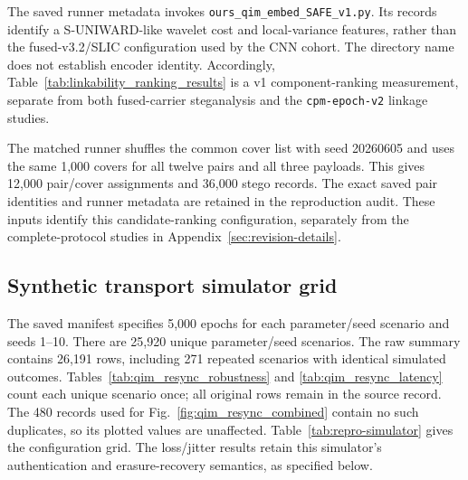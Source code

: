 \documentclass[journal]{IEEEtran}
\theoremstyle{definition}
\theoremstyle{game}
\begin{document}
The saved runner metadata invokes \texttt{ours\_qim\_embed\_SAFE\_v1.py}.
Its records identify a S-UNIWARD-like wavelet cost and local-variance
features, rather than the fused-v3.2/SLIC configuration used by the CNN
cohort. The directory name does not establish encoder identity. Accordingly,
Table~\ref{tab:linkability_ranking_results} is a v1 component-ranking
measurement, separate from both fused-carrier steganalysis and the
\texttt{cpm-epoch-v2} linkage studies.

The matched runner shuffles the common cover list with seed 20260605 and
uses the same 1,000 covers for all twelve pairs and all three payloads.
This gives 12,000 pair/cover assignments and 36,000 stego records.
The exact saved pair identities and runner metadata are retained in the
reproduction audit. These inputs identify this candidate-ranking configuration, separately
from the complete-protocol studies in Appendix~\ref{sec:revision-details}.

\subsection{Synthetic transport simulator grid}
\label{subsec:repro-simulator}
The saved manifest specifies 5,000 epochs for each parameter/seed
scenario and seeds 1--10. There are 25,920 unique parameter/seed scenarios.
The raw summary contains 26,191 rows, including 271 repeated scenarios
with identical simulated outcomes. Tables~\ref{tab:qim_resync_robustness}
and \ref{tab:qim_resync_latency} count each unique scenario once; all
original rows remain in the source record. The 480 records used for
Fig.~\ref{fig:qim_resync_combined} contain no such duplicates, so its
plotted values are unaffected. Table~\ref{tab:repro-simulator} gives the
configuration grid. The loss/jitter results retain this simulator's authentication and
erasure-recovery semantics, as specified below.
\end{document}

